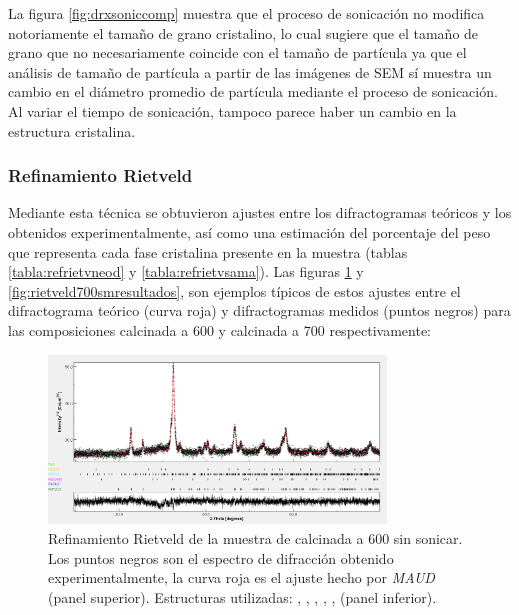 \documentclass[../main.tex]{subfiles}
\begin{document}
La figura \ref{fig:drxsoniccomp} muestra que el proceso de sonicación no modifica notoriamente el tamaño de grano cristalino, lo cual sugiere que el tamaño de grano que no necesariamente coincide con el tamaño de partícula ya que el análisis de tamaño de partícula a partir de las imágenes de SEM sí muestra un cambio en el diámetro promedio de partícula mediante el proceso de sonicación. Al variar el tiempo de sonicación, tampoco parece haber un cambio en la estructura cristalina.

\subsubsection{Refinamiento Rietveld} \label{sec:resrietlveld}
Mediante esta técnica se obtuvieron ajustes entre los difractogramas teóricos y los obtenidos experimentalmente, así como una estimación del porcentaje del peso que representa cada fase cristalina presente en la muestra (tablas \ref{tabla:refrietvneod} y \ref{tabla:refrietvsama}). Las figuras \ref{fig:rietveld600ndresultados} y \ref{fig:rietveld700smresultados}, son ejemplos típicos de estos ajustes entre el difractograma teórico (curva roja) y difractogramas medidos (puntos negros) para las composiciones \neod{} calcinada a 600\gradoC{} y \sama{} calcinada a 700\gradoC{} respectivamente:
\begin{figure}[H]
    \centering
    \includegraphics[width=0.8\textwidth]{fig/DRX600NdFeO3.png}
    \caption{Refinamiento Rietveld de la muestra de \neod{} calcinada a 600\gradoC{} sin sonicar. Los puntos negros son el espectro de difracción obtenido experimentalmente, la curva roja es el ajuste hecho por \textit{MAUD} (panel superior). Estructuras utilizadas: \neod{} \cite{ndfeo3},  \cite{ndoh3},  \cite{feoh2},  \cite{nd2o3},  \cite{fe2o3},  \cite{feo} (panel inferior).}
    \label{fig:rietveld600ndresultados}
\end{figure}
\end{document}
